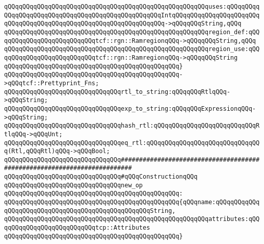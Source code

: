 \verb|qQQqqQQqqQQqqQQqqQQqqQQqqQQqqQQqqQQqqQQqqQQqqQQqqQQqqQQquses:qQQqqQQqqQQqqQQqqQQqqQQqqQQqqQQqqQQqqQQqqQQqqQQqqQQqIntqQQqqQQqqQQqqQQqqQQqqQQqqQQqqQQqqQQqqQQqqQQqqQQqqQQqqQQqqQQqqQQqqQQq->qQQqqQQqString,qQQq|\newline
\verb|qQQqqQQqqQQqqQQqqQQqqQQqqQQqqQQqqQQqqQQqqQQqqQQqqQQqqQQqregion_def:qQQqqQQqqQQqqQQqqQQqqQQqqQQqtcf::rgn::RamregionqQQq->qQQqqQQqString,qQQq|\newline
\verb|qQQqqQQqqQQqqQQqqQQqqQQqqQQqqQQqqQQqqQQqqQQqqQQqqQQqqQQqregion_use:qQQqqQQqqQQqqQQqqQQqqQQqqQQqtcf::rgn::RamregionqQQq->qQQqqQQqString|\newline
\verb|qQQqqQQqqQQqqQQqqQQqqQQqqQQqqQQqqQQqqQQqqQQqqQQq}|\newline
\verb|qQQqqQQqqQQqqQQqqQQqqQQqqQQqqQQqqQQqqQQqqQQqqQQq->qQQqtcf::Prettyprint_Fns;|\newline
\newline
\verb|qQQqqQQqqQQqqQQqqQQqqQQqqQQqqQQqrtl_to_string:qQQqqQQqRtlqQQq->qQQqString;|\newline
\verb|qQQqqQQqqQQqqQQqqQQqqQQqqQQqqQQqexp_to_string:qQQqqQQqExpressionqQQq->qQQqString;|\newline
\verb|qQQqqQQqqQQqqQQqqQQqqQQqqQQqqQQqhash_rtl:qQQqqQQqqQQqqQQqqQQqqQQqqQQqRtlqQQq->qQQqUnt;|\newline
\verb|qQQqqQQqqQQqqQQqqQQqqQQqqQQqqQQqeq_rtl:qQQqqQQqqQQqqQQqqQQqqQQqqQQqqQQq(Rtl,qQQqRtl)qQQq->qQQqBool;|\newline
\newline
\newline
\newline
\verb|qQQqqQQqqQQqqQQqqQQqqQQqqQQqqQQq#########################################################################|\newline
\verb|qQQqqQQqqQQqqQQqqQQqqQQqqQQqqQQq#qQQqConstructionqQQq|\newline
\newline
\verb|qQQqqQQqqQQqqQQqqQQqqQQqqQQqqQQqnew_op|\newline
\verb|qQQqqQQqqQQqqQQqqQQqqQQqqQQqqQQqqQQqqQQqqQQqqQQq:|\newline
\verb|qQQqqQQqqQQqqQQqqQQqqQQqqQQqqQQqqQQqqQQqqQQqqQQq{qQQqname:qQQqqQQqqQQqqQQqqQQqqQQqqQQqqQQqqQQqqQQqqQQqqQQqqQQqString,|\newline
\verb|qQQqqQQqqQQqqQQqqQQqqQQqqQQqqQQqqQQqqQQqqQQqqQQqqQQqqQQqattributes:qQQqqQQqqQQqqQQqqQQqqQQqqQQqtcp::Attributes|\newline
\verb|qQQqqQQqqQQqqQQqqQQqqQQqqQQqqQQqqQQqqQQqqQQqqQQq}|\newline
